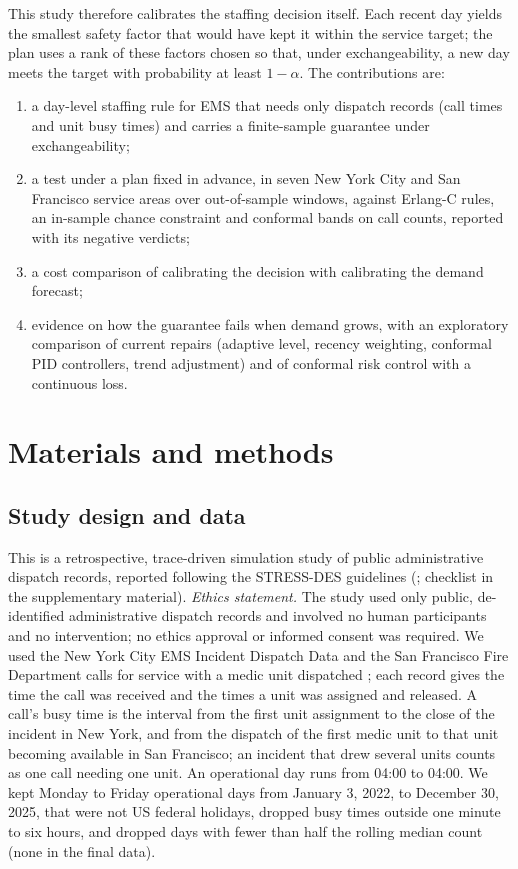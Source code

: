 \documentclass[12pt]{article}
\begin{document}
This study therefore calibrates the staffing decision itself. Each recent day yields the smallest safety factor that would have kept it within the service target; the plan uses a rank of these factors chosen so that, under exchangeability, a new day meets the target with probability at least $1-\alpha$. The contributions are:
\begin{enumerate}
\item a day-level staffing rule for EMS that needs only dispatch records (call times and unit busy times) and carries a finite-sample guarantee under exchangeability;
\item a test under a plan fixed in advance, in seven New York City and San Francisco service areas over  out-of-sample windows, against Erlang-C rules, an in-sample chance constraint and conformal bands on call counts, reported with its negative verdicts;
\item a cost comparison of calibrating the decision with calibrating the demand forecast;
\item evidence on how the guarantee fails when demand grows, with an exploratory comparison of current repairs (adaptive level, recency weighting, conformal PID controllers, trend adjustment) and of conformal risk control with a continuous loss.
\end{enumerate}

\section{Materials and methods}

\subsection{Study design and data}

This is a retrospective, trace-driven simulation study of public administrative dispatch records, reported following the STRESS-DES guidelines (\citealp{monks2019stress}; checklist in the supplementary material). \emph{Ethics statement.} The study used only public, de-identified administrative dispatch records and involved no human participants and no intervention; no ethics approval or informed consent was required. We used the New York City EMS Incident Dispatch Data \citep{nycems2026} and the San Francisco Fire Department calls for service with a medic unit dispatched \citep{sffire2026}; each record gives the time the call was received and the times a unit was assigned and released. A call's busy time is the interval from the first unit assignment to the close of the incident in New York, and from the dispatch of the first medic unit to that unit becoming available in San Francisco; an incident that drew several units counts as one call needing one unit. An operational day runs from 04:00 to 04:00. We kept Monday to Friday operational days from January 3, 2022, to December 30, 2025, that were not US federal holidays, dropped busy times outside one minute to six hours, and dropped days with fewer than half the rolling median count (none in the final data).
\end{document}
